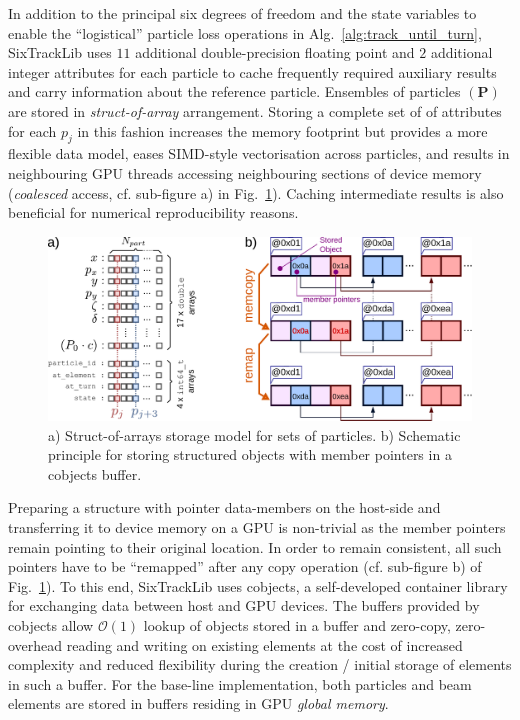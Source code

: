 \documentclass[a4paper,
               refpage,       %
               keeplastbox,   %
               ]{jacow}
\begin{document}
In addition to the principal six degrees of freedom and the state variables to enable the ``logistical'' particle loss operations in Alg.~\ref{alg:track_until_turn}, SixTrackLib uses $11$ additional double-precision floating point and $2$ additional integer attributes for each particle to cache frequently required auxiliary results and carry information about the reference particle. Ensembles of particles $\left(\mathbf{P}\right)$ are stored in \textit{struct-of-array} arrangement. Storing a  complete set of of attributes for each $p_j$ in this fashion increases the memory footprint but provides a more flexible data model, eases SIMD-style vectorisation across particles, and results in neighbouring GPU threads accessing neighbouring sections of device memory (\textit{coalesced} access, cf. sub-figure a) in Fig.~\ref{fig:cobjects}). Caching intermediate results is also beneficial for numerical reproducibility reasons.
\begin{figure}[!hbt]
    \centering
    \includegraphics*[width=.95\columnwidth]{fig_cobjects}
    \caption{a) Struct-of-arrays storage model for sets of particles. b) Schematic principle for storing structured objects with member pointers in a cobjects buffer.}
    \label{fig:cobjects}
\end{figure}
Preparing a structure with pointer data-members on the host-side and transferring it to device memory on a GPU is non-trivial as the member pointers remain pointing to their original location. In order to remain consistent, all such pointers have to be ``remapped'' after any copy operation (cf. sub-figure b) of Fig.~\ref{fig:cobjects}). To this end, SixTrackLib uses cobjects\cite{cobjects-repo-2021}, a self-developed container library for exchanging data between host and GPU devices. The buffers provided by cobjects allow $\mathcal{O}(1)$  lookup of objects stored in a buffer and zero-copy, zero-overhead reading and writing on existing elements at the cost of increased complexity and reduced flexibility during the creation / initial storage of elements in such a buffer. For the base-line implementation, both particles and beam elements are stored in buffers residing in GPU \textit{global memory}.
\end{document}
